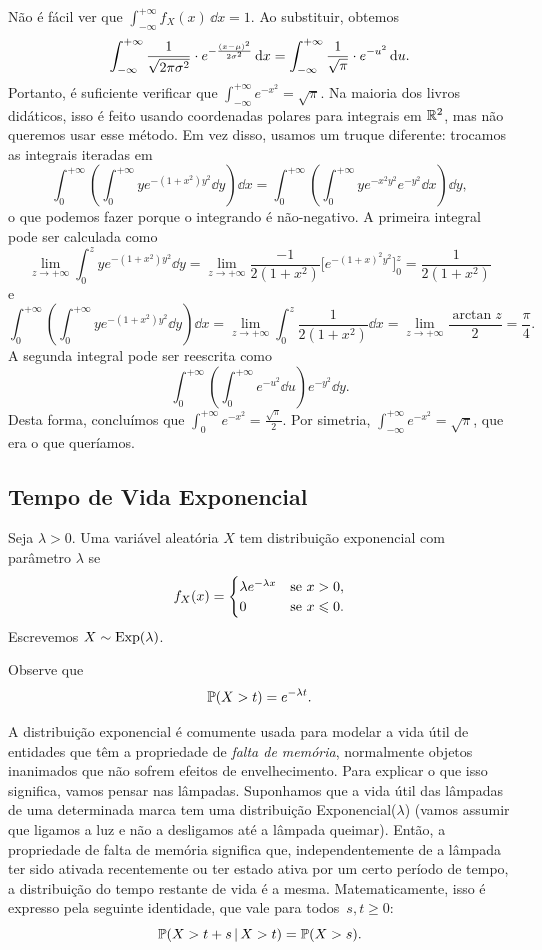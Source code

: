 \begin{remark}
Não é fácil ver que
$ \int_{-\infty}^{+\infty} f_X(x) \, \dd x = 1 $.
Ao substituir, obtemos
\[
\int_{-\infty}^{+\infty}
\frac{1}{\sqrt{2\pi \sigma^2}} \cdot e ^{-\frac{(x-\mu)^2}{2\sigma^2}}
\, \mathrm{d} x
=
\int_{-\infty}^{+\infty}
\frac{1}{\sqrt{\pi}} \cdot e ^{-u^2}
\, \mathrm{d} u
.
\]
Portanto, é suficiente verificar que
$ \int_{-\infty}^{+\infty} e^{-x^2} = \sqrt{\pi} $.
Na maioria dos livros didáticos, isso é feito usando coordenadas polares para integrais em $ \mathbb{R}^2 $, mas não queremos usar esse método.
Em vez disso, usamos um truque diferente: trocamos as integrais iteradas em
\[
\int_0^{+\infty}\left(
      \int_0^{+\infty} ye^{-(1+x^2)y^2}\dd y\right)\dd x
=
\int_0^{+\infty}\left(
      \int_0^{+\infty} y e^{-x^2y^2} e^{-y^2} \dd x\right)\dd y
,
\]
o que podemos fazer porque o integrando é não-negativo.
A primeira integral pode ser calculada como
\[
\lim_{z\to{+\infty}}
\int_0^z
ye^{-(1+x^2)y^2}\dd y
=
\lim_{z\to{+\infty}}
\frac{-1}{2(1+x^2)}
\Big[
e^{-(1+x)^2 y^2}
\Big]_0^z
=
\frac{1}{2(1+x^2)}
\]
e
\[
\int_0^{+\infty}\left(
      \int_0^{+\infty} ye^{-(1+x^2)y^2}\dd y\right)\dd x
=
\lim_{z\to{+\infty}}
\int_0^{z}
\frac{1}{2(1+x^2)}
\dd x
=
\lim_{z\to{+\infty}}
\frac{\arctan z}{2}
=
\frac{\pi}{4}
.
\]
A segunda integral pode ser reescrita como
\[
\int_0^{+\infty}
\left( \int_0^{+\infty} e^{-u^2}\dd u \right)
e^{-y^2}\dd y
.
\]
Desta forma, concluímos que
$ \int_{0}^{+\infty} e^{-x^2} = \frac{\sqrt{\pi}}{2} $.
Por simetria,
$ \int_{-\infty}^{+\infty} e^{-x^2} = \sqrt{\pi} $,
que era o que queríamos.
\end{remark}

\subsection{Tempo de Vida Exponencial}

Seja $\lambda > 0$. Uma variável aleatória $X$ tem distribuição exponencial com parâmetro $\lambda$ se
\[
f_X(x) = \begin{cases} \lambda e ^{-\lambda x} & \text{se } x > 0,
\\
0 & \text{se } x\leqslant 0
.
\end{cases}
\]
Escrevemos $X \sim \mathrm{Exp}(\lambda)$.

Observe que
\[
\mathbb{P}(X>t) = e^{-\lambda t}
.
\]

A distribuição exponencial é comumente usada para modelar a vida útil de entidades que têm a propriedade de \textit{falta de memória}, normalmente objetos inanimados que não sofrem efeitos de envelhecimento.
Para explicar o que isso significa, vamos pensar nas lâmpadas. Suponhamos que a vida útil das lâmpadas de uma determinada marca tem uma distribuição Exponencial($\lambda$) (vamos assumir que ligamos a luz e não a desligamos até a lâmpada queimar). Então, a propriedade de falta de memória significa que, independentemente de a lâmpada ter sido ativada recentemente ou ter estado ativa por um certo período de tempo, a distribuição do tempo restante de vida é a mesma. Matematicamente, isso é expresso pela seguinte identidade, que vale para todos~$s,t \ge 0$:
\[\mathbb{P}(X>t+s \,|\,  X> t) = \mathbb{P}(X > s).\]

